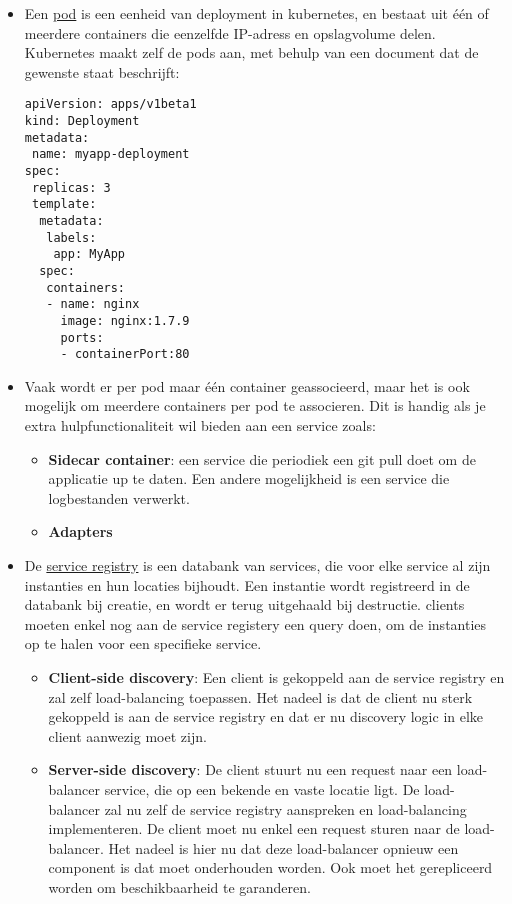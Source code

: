 \begin{itemize}
		\item[\info] Een \underline{pod} is een eenheid van deployment in kubernetes, en bestaat uit één of meerdere containers die eenzelfde IP-adress en opslagvolume delen. Kubernetes maakt zelf de pods aan, met behulp van een document dat de gewenste staat beschrijft:
		\begin{lstlisting}
apiVersion: apps/v1beta1
kind: Deployment
metadata:
 name: myapp-deployment
spec:
 replicas: 3
 template:
  metadata:
   labels:
	app: MyApp
  spec:
   containers:
   - name: nginx
	 image: nginx:1.7.9
	 ports:
	 - containerPort:80
		\end{lstlisting}

		\item[\info] Vaak wordt er per pod maar één container geassocieerd, maar het is ook mogelijk om meerdere containers per pod te associeren. Dit is handig als je extra hulpfunctionaliteit wil bieden aan een service zoals:
		\begin{itemize} 
			\item[\info] \textbf{Sidecar container}: een service die periodiek een git pull doet om de applicatie up te daten. Een andere mogelijkheid is een service die logbestanden verwerkt.
			\item[\info] \textbf{Adapters}      
		\end{itemize}

		\item[\info] De \underline{service registry} is een databank van services, die voor elke service al zijn instanties en hun locaties bijhoudt. Een instantie wordt registreerd in de databank bij creatie, en wordt er terug uitgehaald bij destructie. clients moeten enkel nog aan de service registery een query doen, om de instanties op te halen voor een specifieke service. 
		\begin{itemize}
			\item[\info] \textbf{Client-side discovery}: Een client is gekoppeld aan de service registry en zal zelf load-balancing toepassen. Het nadeel is dat de client nu sterk gekoppeld is aan de service registry en dat er nu discovery logic in elke client aanwezig moet zijn.
			\item[\info] \textbf{Server-side discovery}: De client stuurt nu een request naar een load-balancer service, die op een bekende en vaste locatie ligt. De load-balancer zal nu zelf de service registry aanspreken en load-balancing implementeren. De client moet nu enkel een request sturen naar de load-balancer. Het nadeel is hier nu dat deze load-balancer opnieuw een component is dat moet onderhouden worden. Ook moet het gerepliceerd worden om beschikbaarheid te garanderen.
		\end{itemize}


\end{itemize}

